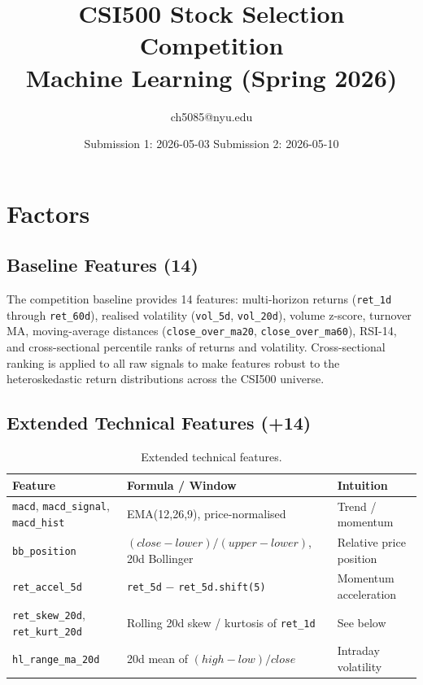 \documentclass[11pt,a4paper]{article}
\title{\textbf{CSI500 Stock Selection Competition}\\[0.4em]
       \large Machine Learning (Spring 2026)}
\author{ch5085@nyu.edu}
\date{Submission 1: 2026-05-03 \quad Submission 2: 2026-05-10}
\begin{document}
\maketitle
\tableofcontents
\newpage

\section{Factors}

\subsection{Baseline Features (14)}

The competition baseline provides 14 features: multi-horizon returns
(\texttt{ret\_1d} through \texttt{ret\_60d}), realised volatility
(\texttt{vol\_5d}, \texttt{vol\_20d}), volume z-score, turnover MA,
moving-average distances (\texttt{close\_over\_ma20},
\texttt{close\_over\_ma60}), RSI-14, and cross-sectional percentile
ranks of returns and volatility. Cross-sectional ranking is applied
to all raw signals to make features robust to the heteroskedastic
return distributions across the CSI500 universe.

\subsection{Extended Technical Features (+14)}

\begin{table}[h]
\centering
\begin{tabular}{lll}
\toprule
Feature & Formula / Window & Intuition \\
\midrule
\texttt{macd}, \texttt{macd\_signal}, \texttt{macd\_hist}
  & EMA(12,26,9), price-normalised & Trend / momentum \\
\texttt{bb\_position}
  & $(close - lower)/(upper - lower)$, 20d Bollinger & Relative price position \\
\texttt{ret\_accel\_5d}
  & \texttt{ret\_5d} $-$ \texttt{ret\_5d.shift(5)} & Momentum acceleration \\
\texttt{ret\_skew\_20d}, \texttt{ret\_kurt\_20d}
  & Rolling 20d skew / kurtosis of \texttt{ret\_1d} & See below \\
\texttt{hl\_range\_ma\_20d}
  & 20d mean of $(high-low)/close$ & Intraday volatility \\
\bottomrule
\end{tabular}
\caption{Extended technical features.}
\end{table}
\end{document}
